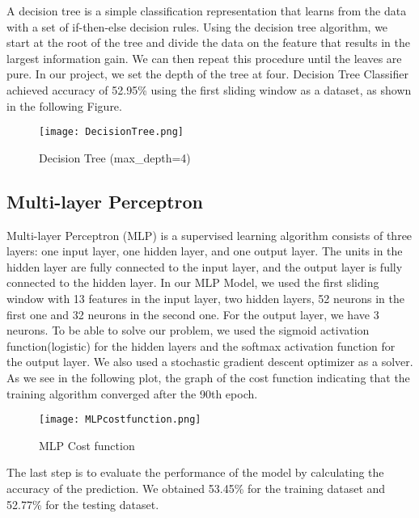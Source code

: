A decision tree is a simple classification representation that learns from the data with a set of if-then-else decision rules.\newline \newline
Using the decision tree algorithm, we start at the root of the tree and divide the data on the feature that results in the largest information gain. We can then repeat this procedure until the leaves are pure.\newline \newline
In our project, we set the depth of the tree at four.\newline
Decision Tree Classifier achieved accuracy of 52.95\% using the first sliding window as a dataset, as shown in the following Figure.
\begin{figure}[H]
\begin{center}
\texttt{[image: DecisionTree.png]}
\end{center}
\caption{Decision Tree (max\_depth=4)}
\label{fig:DecisionTree}
\end{figure}


\subsection{Multi-layer Perceptron}

Multi-layer Perceptron (MLP) is a supervised learning algorithm consists of three layers: one input layer, one hidden layer, and one output layer. The units in the hidden layer are fully connected to the input layer, and the output layer is fully connected to the hidden layer.\newline \newline %
In our MLP Model, we used the first sliding window with 13 features in the input layer, two hidden layers, 52 neurons in the first one and 32 neurons in the second one. For the output layer, we have 3 neurons.\newline \newline  
To be able to solve our problem, we used the sigmoid activation function(logistic) for the hidden layers and the softmax activation function for the output layer. We also used a stochastic gradient descent optimizer as a solver. \newline 
As we see in the following plot, the graph of the cost function indicating that the training algorithm converged after the 90th epoch. \newline
\begin{figure}[H]
\begin{center}
\texttt{[image: MLPcostfunction.png]}
\end{center}
\caption{MLP Cost function}
\label{fig:MLPcostfunction}
\end{figure}
The last step is to evaluate the performance of the model by calculating the accuracy of the prediction. We obtained 53.45\% for the training dataset and 52.77\% for the testing dataset.


